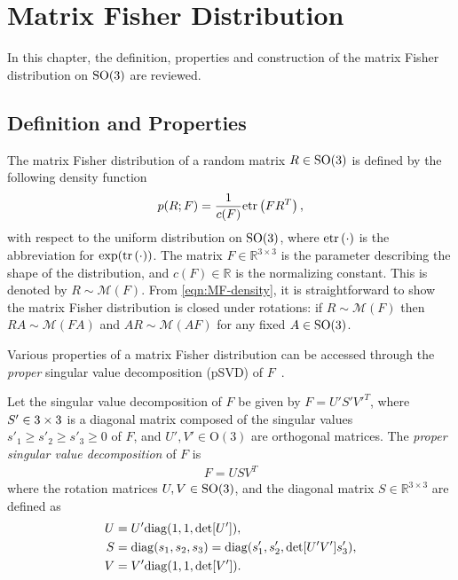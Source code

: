 \section{Matrix Fisher Distribution} \label{section:MF-MF}

In this chapter, the definition, properties and construction of the matrix Fisher distribution on $\mathrm{SO}(3)$ are reviewed.

\subsection{Definition and Properties}

The matrix Fisher distribution of a random matrix $R\in\mathrm{SO}(3)$ is defined by the following density function
\begin{equation} \label{eqn:MF-density}
	p(R;F) = \frac{1}{c(F)}\mathrm{etr}\left( FR^T \right),
\end{equation}
with respect to the uniform distribution on $\mathrm{SO}(3)$, where $\mathrm{etr}\left( \cdot \right)$ is the abbreviation for $\exp(\mathrm{tr}\left( \cdot \right))$.
The matrix $F\in\mathbb{R}^{3\times 3}$ is the parameter describing the shape of the distribution, and $c(F)\in\mathbb{R}$ is the normalizing constant.
This is denoted by $R\sim\mathcal{M}(F)$.
From \eqref{eqn:MF-density}, it is straightforward to show the matrix Fisher distribution is closed under rotations: if $R\sim\mathcal{M}(F)$ then $RA \sim \mathcal{M}(FA)$ and $AR \sim \mathcal{M}(AF)$ for any fixed $A\in\mathrm{SO}(3)$. 

Various properties of a matrix Fisher distribution can be accessed through the \textit{proper} singular value decomposition (pSVD) of $F$~\cite{khatri1977mises,lee2018bayesian,markley1988attitude}.

\begin{definition} \label{def:psvd}
	Let the singular value decomposition of $F$ be given by $F= U'S' V'^T$, where $S'\in\real{3\times3}$ is a diagonal matrix composed of the singular values $ s'_1\geq s'_2\geq s'_3\geq 0$ of $F$, and $U',V'\in\mathrm{O}(3)$ are orthogonal matrices.
	The \textit{proper singular value decomposition} of $F$ is 
	\begin{align}
		F=USV^T
	\end{align}
	where the rotation matrices $U,V\in\mathrm{SO}(3)$, and the diagonal matrix $S\in\mathbb{R}^{3\times 3}$ are defined as
	\begin{align}
		U &= U'\mathrm{diag}(1,1,\det[U']), \nonumber \\
		S &= \mathrm{diag}(s_1,s_2,s_3)=\mathrm{diag}(s'_1,s'_2,\det[U'V']s'_3), \nonumber \\
		V &= V'\mathrm{diag}(1,1,\det[V']).
	\end{align}
\end{definition}

